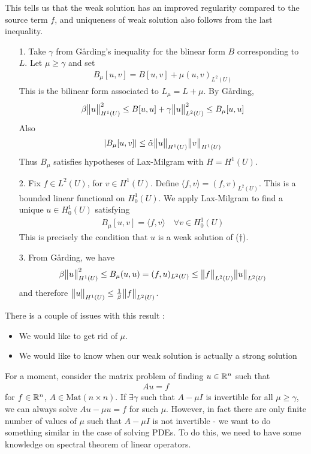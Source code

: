 \documentclass[10pt,a4paper]{report}
\newenvironment{proof}
{\begin{changemargin}{1cm}{0.5cm} 
	}%
	{\end{changemargin}
}
\begin{document}
This tells us that the weak solution has an improved regularity compared to the source term $f$, and uniqueness of weak solution also follows from the last inequality.
\begin{proof}
\pf \begin{itemize}
\item[1.] Take $\gamma$ from G{\aa}rding's inequality for the blinear form $B$ corresponding to $L$. Let $\mu \geq \gamma$ and set
\begin{align*}
B_{\mu}[u,v] = B[u,v] + \mu (u,v)_{L^2(U)}
\end{align*}
This is the bilinear form associated to $L_{\mu}  = L+\mu$. By G{\aa}rding,
\begin{align*}
\beta \bigl\lVert u\bigr\rVert_{H^1(U)}^2 \leq B[u,u] + \gamma \bigl\lVert u\bigr\rVert_{L^2(U)}^2 \leq B_{\mu} [u,u]
\end{align*}
Also
\begin{align*}
|B_{\mu}[u,v]| \leq \tilde{\alpha}\bigl\lVert u\bigr\rVert_{H^1(U)} \bigl\lVert v\bigr\rVert_{H^1(U)}
\end{align*}
Thus $B_{\mu}$ satisfies hypotheses of Lax-Milgram with $H=H^1(U)$.
\item[2.] Fix $f\in L^2(U)$, for $v\in H^1(U)$. Define $\langle f,v\rangle = (f,v)_{L^2(U)}$. This is a bounded linear functional on $H^1_0(U)$. We apply Lax-Milgram to find a unique $u\in H_0^1(U)$ satisfying
\begin{align*}
B_{\mu}[u,v] = \langle f,v\rangle \quad \forall v\in H_0^1(U)
\end{align*}
This is precisely the condition that $u$ is a weak solution of ($\dagger$).
\item[3.] From G{\aa}rding, we have
\begin{align*}
\beta \bigl\lVert u\bigr\rVert_{H^1(U)}^2 \leq B_{\mu} (u,u) = (f,u)_{L^2(U)} \leq \bigl\lVert f\bigr\rVert_{L^2(U)} \bigl\lVert u\bigr\rVert_{L^2(U)}
\end{align*}
and therefore $\bigl\lVert u\bigr\rVert_{H^1(U)} \leq \frac{1}{\beta} \bigl\lVert f\bigr\rVert_{L^2(U)}$.
\end{itemize}

\eop
\end{proof}
\s

There is a couple of issues with this result :
\begin{itemize}
\item We would like to get rid of $\mu$.
\item We would like to know when our weak solution is actually a strong solution
\end{itemize}
\s

For a moment, consider the matrix problem of finding $u\in \mathbb{R}^n$ such that
\begin{align*}
Au = f
\end{align*}
for $f\in \mathbb{R}^n$, $A\in \text{Mat}(n\times n)$. If $\exists \gamma$ such that $A- \mu I$  is invertible for all $\mu \geq \gamma$, we can always solve $Au - \mu u =f$ for such $\mu$. However, in fact there are only finite number of values of $\mu$ such that $A - \mu I$ is not invertible - we want to do something similar in the case of solving PDEs. To do this, we need to have some knowledge on spectral theorem of linear operators.
\s
\end{document}
